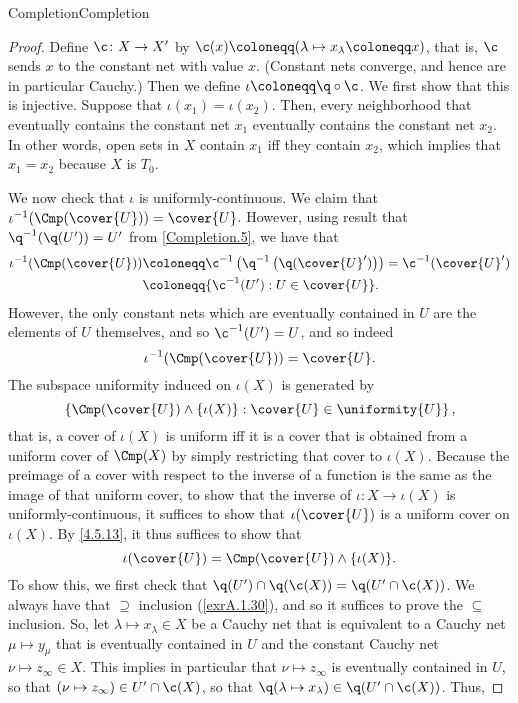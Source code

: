 \begin{thm}{Completion}{Completion}
\begin{proof}
Define $\c \colon X\rightarrow X'$ by $\c (x)\coloneqq (\lambda \mapsto x_{\lambda}\coloneqq x)$, that is, $\c$ sends $x$ to the constant net with value $x$.  (Constant nets converge, and hence are in particular Cauchy.)  Then we define $\iota \coloneqq \q \circ \c$.  We first show that this is injective.  Suppose that $\iota (x_1)=\iota (x_2)$.  Then, every neighborhood that eventually contains the constant net $x_1$ eventually contains the constant net $x_2$.  In other words, open sets in $X$ contain $x_1$ iff they contain $x_2$, which implies that $x_1=x_2$ because $X$ is $T_0$.

We now check that $\iota$ is uniformly-continuous.  We claim that $\iota ^{-1}(\Cmp (\cover{U}))=\cover{U}$.  However, using result that $\q ^{-1}(\q (U'))=U'$ from \cref{Completion.5}, we have that
\begin{equation}
\begin{split}
\iota ^{-1}(\Cmp (\cover{U})) & \coloneqq \c ^{-1}\left( \q ^{-1}\left( \q (\cover{U}')\right) \right) =\c ^{-1}(\cover{U}') \\
& \coloneqq \{ \c ^{-1}(U'):U\in \cover{U}\} .
\end{split}
\end{equation}
However, the only constant nets which are eventually contained in $U$ are the elements of $U$ themselves, and so $\c ^{-1}(U')=U$, and so indeed
\begin{equation}
\iota ^{-1}(\Cmp (\cover{U}))=\cover{U}.
\end{equation}
The subspace uniformity induced on $\iota (X)$ is generated by
\begin{equation}\label{4.5.13}
\left\{ \Cmp (\cover{U})\wedge \{ \iota (X)\} :\cover{U}\in \uniformity{U}\right\} ,
\end{equation}
that is, a cover of $\iota (X)$ is uniform iff it is a cover that is obtained from a uniform cover of $\Cmp (X)$ by simply restricting that cover to $\iota (X)$.  Because the preimage of a cover with respect to the inverse of a function is the same as the image of that uniform cover, to show that the inverse of $\iota :X\rightarrow \iota (X)$ is uniformly-continuous, it suffices to show that $\iota (\cover{U})$ is a uniform cover on $\iota (X)$.  By \eqref{4.5.13}, it thus suffices to show that
\begin{equation}\label{4.5.14}
\iota (\cover{U})=\Cmp (\cover{U})\wedge \{ \iota (X)\} .
\end{equation}
To show this, we first check that $\q (U')\cap \q (\c (X))=\q (U'\cap \c (X))$.  We always have that $\supseteq$ inclusion (\cref{exrA.1.30}), and so it suffices to prove the $\subseteq$ inclusion.  So, let $\lambda \mapsto x_{\lambda}\in X$ be a Cauchy net that is equivalent to a Cauchy net $\mu \mapsto y_{\mu}$ that is eventually contained in $U$ and the constant Cauchy net $\nu \mapsto z_{\infty}\in X$.  This implies in particular that $\nu \mapsto z_{\infty}$ is eventually contained in $U$, so that $(\nu \mapsto z_{\infty})\in U'\cap \c (X)$, so that $\q (\lambda \mapsto x_{\lambda})\in \q (U'\cap \c (X))$.  Thus,

\end{proof}
\end{thm}
